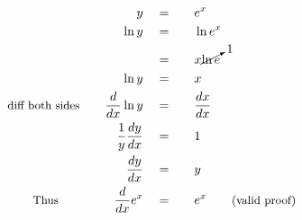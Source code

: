 \begin{alignat*}{5}
&\,&y\quad&=\quad&&e^x\\
&\,&\ln{y}\quad&=&&\ln{e^x}\\
&\,&\,&=&&x\cancelto{1}{\ln{e}}\\
&\,&\ln{y}\quad&=&&x\\
&\small\text{diff both sides}\normalsize\quad&\frac{d}{dx}\ln{y}\quad&=&&\frac{dx}{dx}\\
&\,&\frac{1}{y}\frac{dy}{dx}\quad&=&&1\\
&\,&\frac{dy}{dx}\quad&=&&y\\
&\qquad\small\text{Thus}\normalsize\qquad&\frac{d}{dx}e^x\quad&=&&e^x\qquad\small\text{(valid proof)}
\end{alignat*}
